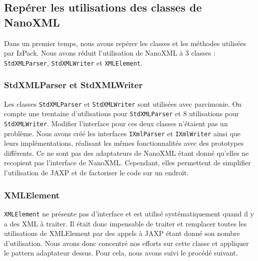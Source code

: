 \subsection{Repérer les utilisations des classes de NanoXML}
Dans un premier temps, nous avons repérer les classes et les méthodes utilisées par IzPack.
Nous avons réduit l'utilisation de NanoXML à 3 classes : \verb|StdXMLParser|, \verb|StdXMLWriter| et \verb|XMLElement|.
\subsubsection{StdXMLParser et StdXMLWriter}
Les classes \verb|StdXMLParser| et \verb|StdXMLWriter| sont utilisées avec parcimonie.
On compte une trentaine d'utilisations pour \verb|StdXMLParser| et 8 utilisations pour \verb|StdXMLWriter|.
Modifier l'interface pour ces deux classes n'étaient pas un problème.
Nous avons créé les interfaces \verb|IXmlParser| et \verb|IXmlWriter| ainsi que leurs implémentations, réalisant les mêmes fonctionnalités avec des prototypes différents.
Ce ne sont pas des adaptateurs de NanoXML étant donné qu'elles ne recopient pas l'interface de NanoXML.
Cependant, elles permettent de simplifier l'utilisation de JAXP et de factoriser le code sur un endroit.
\subsubsection{XMLElement}
\verb|XMLElement| ne présente pas d'interface et est utilisé systématiquement quand il y a des XML à traiter.
Il était donc impensable de traiter et remplacer toutes les utilisations de XMLElement par des appels à JAXP étant donné son nombre d'utilisation.
Nous avons donc concentré nos efforts sur cette classe et appliquer le pattern adaptateur dessus.
Pour cela, nous avons suivi le procédé suivant.

